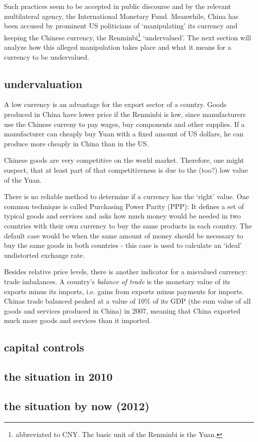 \documentclass[11pt]{article}
\begin{document}
Such practices seem to be accepted in public discourse and by the relevant multilateral agency, the International Monetary Fund. Meanwhile, China has been accused by prominent US politicians of `manipulating' its currency and keeping the Chinese currency, the Renminbi\footnote{abbreviated to CNY. The basic unit of the Renminbi is the Yuan.} `undervalued'. The next section will analyze how this alleged manipulation takes place and what it means for a currency to be undervalued. 

\subsection{undervaluation}

A low currency is an advantage for the export sector of a country. Goods produced in China have lower price if the Renminbi is low, since manufacturers use the Chinese curreny to pay wages, buy components and other supplies. If a manufacturer can cheaply buy Yuan with a fixed amount of US dollars, he can produce more cheaply in China than in the US. 

Chinese goods are very competitive on the world market. Therefore, one might suspect, that at least part of that competitiveness is due to the (too?) low value of the Yuan. 

There is no reliable method to determine if a currency has the `right' value. One common technique is called Purchasing Power Parity (PPP): It defines a set of typical goods and services and asks how much money would be needed in two countries with their own currency to buy the same products in each country. The default case would be when the same amount of money should be necessary to buy the same goods in both countries - this case is used to calculate an `ideal' undistorted exchange rate. 

Besides relative price levels, there is another indicator for a misvalued currency: trade imbalances. A country's \emph{balance of trade} is the monetary value of its exports minus its imports, i.e. gains from exports minus payments for imports. Chinas trade balanced peaked at a value of 10\% of its GDP (the sum value of all goods and services produced in China) in 2007, meaning that China exported much more goods and services than it imported. 


\subsection{capital controls}

\subsection{the situation in 2010}

\subsection{the situation by now (2012)}
\end{document}
